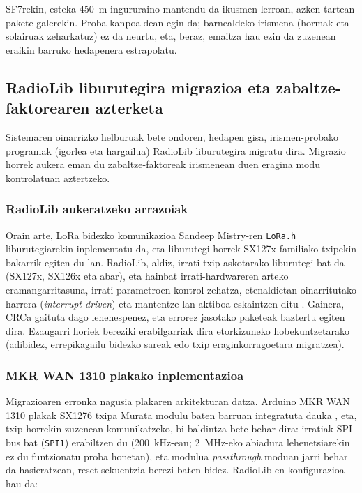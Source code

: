 \documentclass[10pt]{article}
\begin{document}
SF7rekin, esteka 450~m ingururaino mantendu da ikusmen-lerroan, azken tartean pakete-galerekin. Proba kanpoaldean egin da; barnealdeko irismena (hormak eta solairuak zeharkatuz) ez da neurtu, eta, beraz, emaitza hau ezin da zuzenean eraikin barruko hedapenera estrapolatu.\\

\subsection{RadioLib liburutegira migrazioa eta zabaltze-faktorearen azterketa}
\label{sec:radiolib}

Sistemaren oinarrizko helburuak bete ondoren, hedapen gisa, irismen-probako programak (igorlea eta hargailua) RadioLib \cite{radiolib} liburutegira migratu dira. Migrazio horrek aukera eman du zabaltze-faktoreak irismenean duen eragina modu kontrolatuan aztertzeko.\\

\subsubsection{RadioLib aukeratzeko arrazoiak}

Orain arte, \ac{LoRa} bidezko komunikazioa Sandeep Mistry-ren \texttt{LoRa.h} liburutegiarekin \cite{arduinolora} inplementatu da, eta liburutegi horrek SX127x familiako txipekin bakarrik egiten du lan. RadioLib, aldiz, irrati-txip askotarako liburutegi bat da (SX127x, SX126x eta abar), eta hainbat irrati-hardwareren arteko eramangarritasuna, irrati-parametroen kontrol zehatza, etenaldietan oinarritutako harrera (\textit{interrupt-driven}) eta mantentze-lan aktiboa eskaintzen ditu \cite{radiolib}. Gainera, CRCa gaituta dago lehenespenez, eta errorez jasotako paketeak baztertu egiten dira. Ezaugarri horiek bereziki erabilgarriak dira etorkizuneko hobekuntzetarako (adibidez, errepikagailu bidezko sareak edo txip eraginkorragoetara migratzea).\\

\subsubsection{MKR WAN 1310 plakako inplementazioa}

Migrazioaren erronka nagusia plakaren arkitekturan datza. Arduino MKR WAN 1310 plakak SX1276 txipa Murata modulu baten barruan integratuta dauka \cite{arduino_mkrwan1310}, eta, txip horrekin zuzenean komunikatzeko, bi baldintza bete behar dira: irratiak \ac{SPI} bus bat (\texttt{SPI1}) erabiltzen du (200~kHz-ean; 2~MHz-eko abiadura lehenetsiarekin ez du funtzionatu proba honetan), eta modulua \textit{passthrough} moduan jarri behar da hasieratzean, reset-sekuentzia berezi baten bidez. RadioLib-en konfigurazioa hau da:\\
\end{document}
